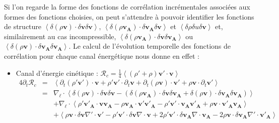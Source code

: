 Si l'on regarde la forme des fonctions de corrélation incrémentales associées aux formes des fonctions choisies, on peut s'attendre à pouvoir identifier les fonctions de structure $\left<\delta \left(\rho\boldsymbol{v}\right) \cdot \delta \boldsymbol{v} \delta \boldsymbol{v}\right>$, $\left<\delta \left(\rho\boldsymbol{v_A}\right) \cdot \delta \boldsymbol{v_A} \delta \boldsymbol{v}\right>$ et $\left<\delta \rho \delta u \delta \boldsymbol{v}\right>$ et, similairement au cas incompressible, $\left<\delta \left(\rho\boldsymbol{v_A}\right) \cdot \delta \boldsymbol{v} \delta \boldsymbol{v_A}\right>$ ou $\left<\delta \left(\rho\boldsymbol{v}\right) \cdot \delta \boldsymbol{v_A} \delta \boldsymbol{v_A}\right>$. Le calcul de l'évolution temporelle des fonctions de corrélation pour chaque canal énergétique nous donne en effet : 
\begin{itemize}
    \item Canal d'énergie cinétique : $\mathcal{R}_{c} = \frac{1}{4}\left<\left(\rho'+\rho\right)\boldsymbol{v'} \cdot \boldsymbol{v}\right>$
\begin{eqnarray}
\label{eq:turb_cpi_Rc} 4\partial_t \mathcal{R}_{c} &=& \left<\partial_t \left(\rho' \boldsymbol{v'} \right)\cdot  \boldsymbol{v}  + \rho' \boldsymbol{v'} \cdot  \partial_t \boldsymbol{v} + \partial_t \left(\rho \boldsymbol{v} \right)\cdot  \boldsymbol{v'}  + \rho \boldsymbol{v} \cdot  \partial_t \boldsymbol{v'} \right>\nonumber \\
&=&\nabla_{\boldsymbol{\ell}} \cdot \left<\delta \left(\rho\boldsymbol{v}\right) \cdot \delta \boldsymbol{v} \delta \boldsymbol{v} -\left(\delta \left(\rho\boldsymbol{v_A}\right) \cdot \delta \boldsymbol{v} \delta \boldsymbol{v_A} + \delta \left(\rho\boldsymbol{v}\right) \cdot \delta \boldsymbol{v_A} \delta \boldsymbol{v_A} \right)\right>\nonumber \\
&&+ \nabla_{\boldsymbol{\ell}} \cdot \left<\rho' \boldsymbol{v'_A}\cdot  \boldsymbol{v} \boldsymbol{v_A} -\rho \boldsymbol{v_A}\cdot  \boldsymbol{v'} \boldsymbol{v'_A}-\rho' \boldsymbol{v'} \cdot\boldsymbol{v_A}\boldsymbol{v'_A} +  \rho  \boldsymbol{v} \cdot\boldsymbol{v'_A}\boldsymbol{v_A}\right> \nonumber\\
&& +\left< \rho \boldsymbol{v} \cdot \delta \boldsymbol{v} \nabla' \cdot \boldsymbol{v'} -\rho' \boldsymbol{v'} \cdot \delta \boldsymbol{v} \nabla \cdot \boldsymbol{v} +2 \rho' \boldsymbol{v'} \cdot \delta \boldsymbol{v_A}\nabla \cdot \boldsymbol{v_A} - 2\rho \boldsymbol{v} \cdot \delta \boldsymbol{v_A}\nabla' \cdot \boldsymbol{v'_A}\right> \nonumber\\

\end{eqnarray}
\end{itemize}
